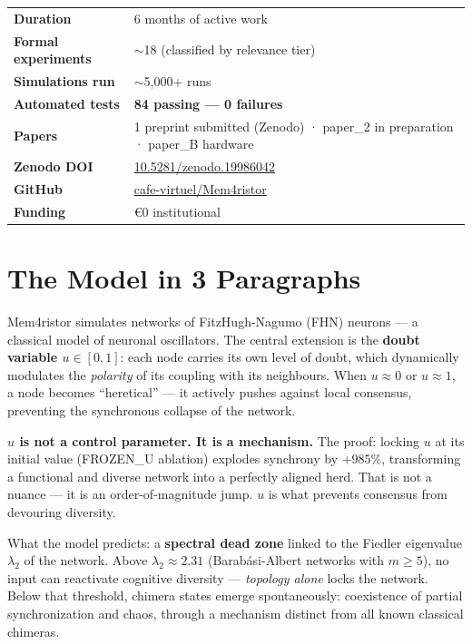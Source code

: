 \documentclass[11pt, a4paper]{article}
\newcommand{\result}[1]{\textbf{\color{positive}#1}}
\newcommand{\kw}[1]{\textbf{#1}}
\begin{document}
\begin{center}
\renewcommand{\arraystretch}{1.25}
\begin{tabular}{p{4.5cm} p{9cm}}
\toprule
\textbf{Duration} & 6 months of active work \\
\textbf{Formal experiments} & $\sim$18 (classified by relevance tier) \\
\textbf{Simulations run} & $\sim$5{,}000+ runs \\
\textbf{Automated tests} & \result{84 passing --- 0 failures} \\
\textbf{Papers} & 1 preprint submitted (Zenodo) · paper\_2 in preparation · paper\_B hardware \\
\textbf{Zenodo DOI} & \href{https://doi.org/10.5281/zenodo.19986042}{10.5281/zenodo.19986042} \\
\textbf{GitHub} & \href{https://github.com/cafe-virtuel/Mem4ristor}{cafe-virtuel/Mem4ristor} \\
\textbf{Funding} & €0 institutional \\
\bottomrule
\end{tabular}
\end{center}

\section{The Model in 3 Paragraphs}

Mem4ristor simulates networks of FitzHugh-Nagumo (FHN) neurons --- a classical model of neuronal
oscillators. The central extension is the \kw{doubt variable $u \in [0,1]$}: each node carries its
own level of doubt, which dynamically modulates the \textit{polarity} of its coupling with its
neighbours. When $u \approx 0$ or $u \approx 1$, a node becomes ``heretical'' --- it actively
pushes against local consensus, preventing the synchronous collapse of the network.

\kw{$u$ is not a control parameter. It is a mechanism.} The proof: locking $u$ at its initial
value (FROZEN\_U ablation) explodes synchrony by \result{$+985\%$}, transforming a functional and
diverse network into a perfectly aligned herd. That is not a nuance --- it is an order-of-magnitude
jump. $u$ is what prevents consensus from devouring diversity.

What the model predicts: a \kw{spectral dead zone} linked to the Fiedler eigenvalue $\lambda_2$
of the network. Above $\lambda_2 \approx 2.31$ (Barabási-Albert networks with $m \geq 5$), no
input can reactivate cognitive diversity --- \textit{topology alone} locks the network. Below that
threshold, chimera states emerge spontaneously: coexistence of partial synchronization and chaos,
through a mechanism distinct from all known classical chimeras.
\end{document}
